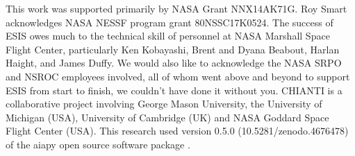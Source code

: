 	This work was supported primarily by NASA Grant NNX14AK71G.
	Roy Smart acknowledges NASA NESSF program grant 80NSSC17K0524. The success of ESIS owes much to the  technical skill of personnel at NASA Marshall Space Flight Center, particularly Ken Kobayashi, Brent and Dyana Beabout, Harlan Haight, and James Duffy.
	We would also like to acknowledge the NASA SRPO and NSROC employees involved, all of whom went above and beyond to support ESIS from start to finish, we couldn't have done it without you. 
	CHIANTI is a collaborative project involving George Mason University, the University of Michigan (USA), University of Cambridge (UK) and NASA Goddard Space Flight Center (USA).
	This research used version 0.5.0 (10.5281/zenodo.4676478) of the aiapy open source software package \citep{aiapy}.

